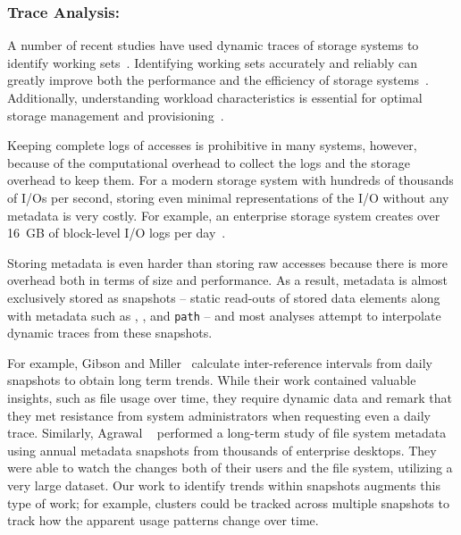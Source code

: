 
\subsubsection*{Trace Analysis: }

A number of recent studies have used dynamic traces of storage systems to
identify working sets~\cite{doraimani2008file,hands}.  Identifying working sets
accurately and reliably can greatly improve both the performance and the
efficiency of storage systems~\cite{bhadkamkar2009borg}.  Additionally,
understanding workload characteristics is essential for optimal storage
management and provisioning~\cite{ian-tos}.

Keeping complete logs of accesses is prohibitive in many systems, however,
because of the computational overhead to collect the logs and the storage
overhead to keep them.  For a modern storage system with hundreds of thousands
of I/Os per second, storing even minimal representations of the I/O without any
metadata is very costly.  For example, an enterprise storage system creates over
16~GB of block-level I/O logs per day~\cite{hands}.

Storing metadata is even harder than storing raw accesses because there
is more overhead both in terms of size and performance.  As a result, metadata
is almost exclusively stored as snapshots -- static read-outs of stored data
elements along with metadata such as \atime, \ctime, and \texttt{path} -- and most
analyses attempt to interpolate dynamic traces from these snapshots.  

For example, Gibson and Miller~\cite{gibson:cmg98} calculate inter-reference
intervals from daily snapshots to
obtain long term trends.  While their work contained valuable insights, such as file
usage over time, they require dynamic data and remark that they met resistance
from system administrators when requesting even a
daily trace.  
Similarly, Agrawal \etal~\cite{agrawal:fast07} performed a long-term study of file system metadata using annual
metadata snapshots from thousands of enterprise desktops.  They were able to
watch the changes both of their users and the file system, utilizing a very large dataset.  Our work to identify
trends within snapshots augments this type of work; for example, clusters could
be tracked across multiple snapshots to track how the apparent usage patterns
change over time.

